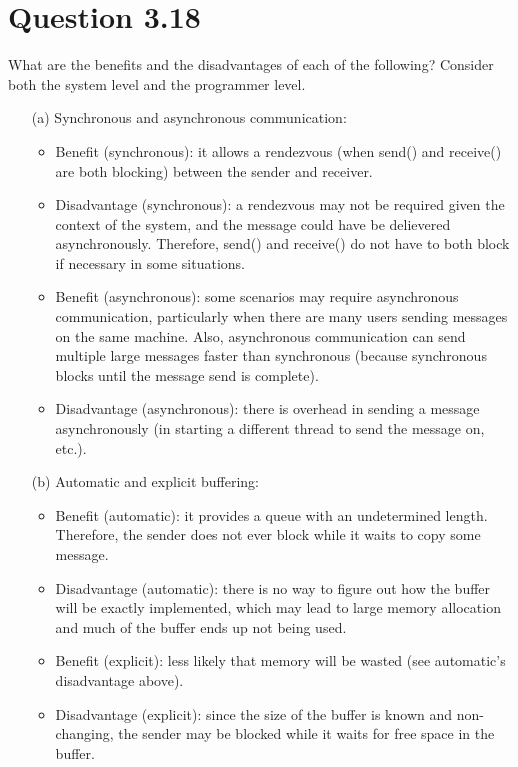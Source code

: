 \documentclass[12pt]{article}
\begin{document}
\section*{Question 3.18} {\color{blue}What are the benefits and the disadvantages of each of the following? Consider both the system level and the programmer level.
\begin{enumerate}
\item[(a)]Synchronous and asynchronous communication: {\color{black}
\begin{itemize}
\item Benefit (synchronous): it allows a rendezvous (when send() and receive() are both blocking) between the sender and receiver. 
\item Disadvantage (synchronous): a rendezvous may not be required given the context of the system, and the message could have be delievered asynchronously. Therefore, send() and receive() do not have to both block if necessary in some situations.
\item Benefit (asynchronous): some scenarios may require asynchronous communication, particularly when there are many users sending messages on the same machine. Also, asynchronous communication can send multiple large messages faster than synchronous (because synchronous blocks until the message send is complete).
\item Disadvantage (asynchronous): there is overhead in sending a message asynchronously (in starting a different thread to send the message on, etc.).
\end{itemize}
}

\item[(b)]Automatic and explicit buffering: {\color{black}
\begin{itemize}
\item Benefit (automatic): it provides a queue with an undetermined length. Therefore, the sender does not ever block while it waits to copy some message. 
\item Disadvantage (automatic): there is no way to figure out how the buffer will be exactly implemented, which may lead to large memory allocation and much of the buffer ends up not being used. 
\item Benefit (explicit): less likely that memory will be wasted (see automatic's disadvantage above).
\item Disadvantage (explicit): since the size of the buffer is known and non-changing, the sender may be blocked while it waits for free space in the buffer.
\end{itemize}
}


\end{enumerate}}
\end{document}
